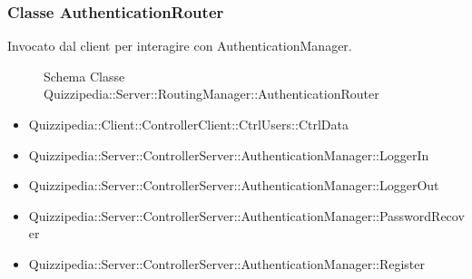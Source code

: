 \subsubsection{Classe AuthenticationRouter}
Invocato dal client per interagire con AuthenticationManager.
\begin{figure}[H]
\centering
\noindent{}
\caption{Schema Classe Quizzipedia::Server::RoutingManager::AuthenticationRouter}
\end{figure}
\begin{itemize}
\item Quizzipedia::Client::ControllerClient::CtrlUsers::CtrlData
\end{itemize}
\begin{itemize}
\item Quizzipedia::Server::ControllerServer::AuthenticationManager::LoggerIn
\item Quizzipedia::Server::ControllerServer::AuthenticationManager::LoggerOut
\item Quizzipedia::Server::ControllerServer::AuthenticationManager::PasswordRecover
\item Quizzipedia::Server::ControllerServer::AuthenticationManager::Register
\end{itemize}
